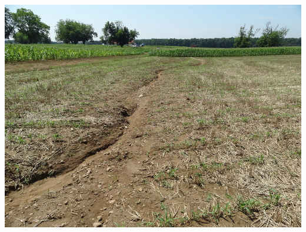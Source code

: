 \documentclass[xcolor={dvipsnames,usenames},beamer]{beamer}
\begin{document}
\begin{frame}{\coursesTitle}
\begin{columns}[c]
\includegraphics[height=0.5\textheight]{./images/edu/erosion}
\hspace{0.2\textwidth}
\end{columns}

\end{frame}
\end{document}

